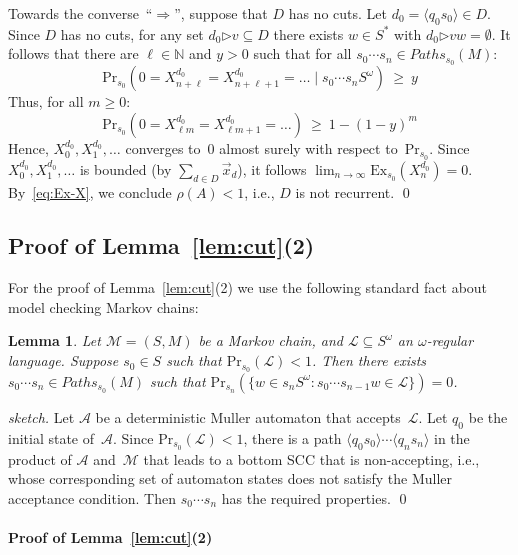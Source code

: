 \documentclass{elsarticle}
\newtheorem{lemma}[definition]{Lemma}
\def\<{\langle}
\def\>{\rangle}
\def\Nat{\mathbb{N}}
\def\cA{\mathcal{A}}
\def\cL{\mathcal{L}}
\def\cM{\mathcal{M}}
\def\Pr{\mathrm{Pr}}
\def\Paths{\mathit{Paths}}
\newcommand{\Ex}{\mathrm{Ex}}
\newcommand{\then}{\mathord{\triangleright}}
\begin{document}
Towards the converse~``$\Longrightarrow$'', suppose that $D$ has no cuts.
Let $d_0 = \<q_0 s_0\> \in D$.
Since $D$ has no cuts, for any set $d_0 \then v \subseteq D$ there exists $w \in S^*$ with $d_0 \then v w = \emptyset$.
It follows that there are $\ell \in \Nat$ and $y > 0$ such that for all $s_0 \cdots s_n \in \Paths_{s_0}(M)$:
\[
\Pr_{s_0}(0 = X^{d_0}_{n+\ell} = X^{d_0}_{n+\ell+1} = \ldots \mid s_0 \cdots s_n S^\omega) \ \geqslant \ y
\]
Thus, for all $m \geqslant 0$:
\[
\Pr_{s_0}(0 = X^{d_0}_{\ell m} = X^{d_0}_{\ell m + 1} = \ldots) \ \geqslant \ 1 - (1-y)^m
\]
Hence, $X^{d_0}_0, X^{d_0}_1, \ldots$ converges to~$0$ almost surely with respect to~$\Pr_{s_0}$.
Since $X^{d_0}_0, X^{d_0}_1, \ldots$ is bounded (by $\sum_{d \in D} \vec{x}_d$), it follows $\lim_{n \to \infty} \Ex_{s_0}(X^{d_0}_n) = 0$.
By~\eqref{eq:Ex-X}, we conclude $\rho(A) < 1$, i.e., $D$ is not recurrent.
\qed

\subsection{Proof of Lemma~\ref{lem:cut}(2)}
For the proof of Lemma~\ref{lem:cut}(2)  we use the following standard
fact about model checking Markov chains:
\begin{lemma} \label{lem:regular}
Let $\cM = (S,M)$ be a Markov chain, and $\cL \subseteq S^\omega$ an $\omega$-regular language.
Suppose $s_0 \in S$ such that $\Pr_{s_0}(\cL) < 1$.
Then there exists $s_0 \cdots s_n \in \Paths_{s_0}(M)$ such that $\Pr_{s_n}(\{ w \in s_n S^\omega : s_0 \cdots s_{n-1} w \in \cL \}) = 0$.
\end{lemma}
\begin{proof}[sketch]
Let $\cA$ be a deterministic Muller automaton that accepts~$\cL$.
Let $q_0$ be the initial state of~$\cA$.
Since $\Pr_{s_0}(\cL) < 1$, there is a path $\<q_0 s_0\> \cdots \<q_n s_n\>$ in the product of $\cA$ and~$\cM$ that leads to a bottom SCC that is non-accepting, i.e., whose corresponding set of automaton states does not satisfy the Muller acceptance condition.
Then $s_0 \cdots s_n$ has the required properties.
\qed
\end{proof}

\paragraph{Proof of Lemma~\ref{lem:cut}(2)}
\end{document}
